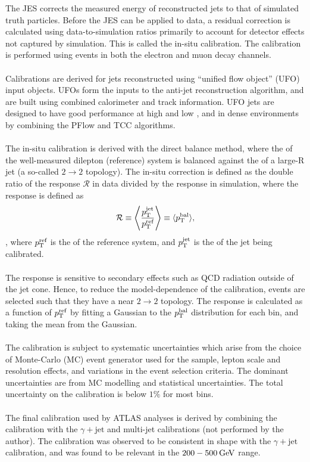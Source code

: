 \documentclass{thesissummary}
\begin{document}
The JES corrects the measured energy of reconstructed jets to that of simulated truth particles. Before the JES can be applied to data, a residual correction is calculated using data-to-simulation ratios primarily to account for detector effects not captured by simulation. This is called the in-situ calibration. The calibration is performed using \zjet events in both the electron and muon decay channels.
\\\\
Calibrations are derived for jets reconstructed using ``unified flow object'' (UFO) input objects. UFOs form the inputs to the anti-\kt jet reconstruction algorithm, and are built using combined calorimeter and track information. UFO jets are designed to have good performance at high and low \pt, and in dense environments by combining the PFlow \cite{pflow} and TCC \cite{tcc} algorithms.
\\\\
The in-situ calibration is derived with the direct balance method, where the \pt of the well-measured dilepton (reference) system is balanced against the \pt of a large-R jet (a so-called $2\rightarrow2$ topology). The in-situ correction is defined as the double ratio of the response $\mathcal{R}$ in data divided by the response in simulation, where the response is defined as 
\begin{equation}
    \mathcal{R} \equiv \Bigg\langle\frac{p_{\text{T}}^{\text{jet}}}{p_{\text{T}}^{\text{ref}}}\Bigg\rangle \equiv \langle p_{\text{T}}^{\text{bal}}\rangle,
\end{equation},
where $p_{\text{T}}^{\text{ref}}$ is the \pt of the reference system, and $p_{\text{T}}^{\text{jet}}$ is the \pt of the jet being calibrated.
\\\\
The response is sensitive to secondary effects such as QCD radiation outside of the jet cone. Hence, to reduce the model-dependence of the calibration, events are selected such that they have a near $2\rightarrow2$ topology. The response is calculated as a function of $p_{\text{T}}^{\text{ref}}$ by fitting a Gaussian to the $p_{\text{T}}^{\text{bal}}$ distribution for each bin, and taking the mean from the Gaussian.%
\\\\
The calibration is subject to systematic uncertainties which arise from the choice of Monte-Carlo (MC) event generator used for the \zjet sample, lepton scale and resolution effects, and variations in the event selection criteria. The dominant uncertainties are from MC modelling and statistical uncertainties. The total uncertainty on the calibration is below $1\%$ for most bins.
\\\\
The final calibration used by ATLAS analyses is derived by combining the \zjet calibration with the $\gamma+\text{jet}$ and multi-jet calibrations (not performed by the author). The \zjet calibration was observed to be consistent in shape with the $\gamma+\text{jet}$ calibration, and was found to be relevant in the $200-500\hspace{2pt}\text{Ge\kern -0.1em V}$ range.
\end{document}
